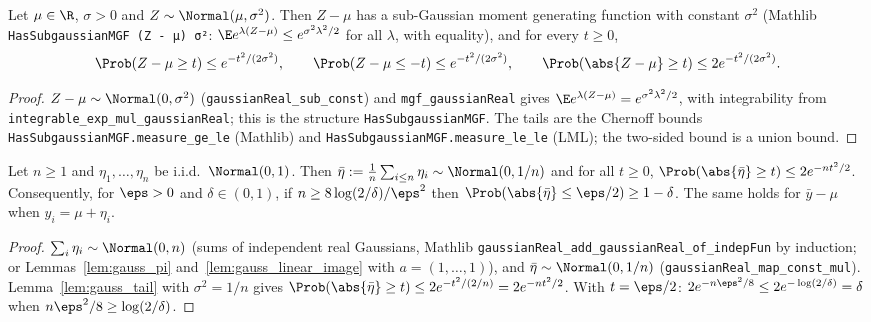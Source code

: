 \begin{lemma}\label{lem:gauss_tail}
\leanok
{}
Let $\mu \in \R$, $\sigma > 0$ and $Z \sim \Normal(\mu,\sigma^2)$. Then $Z - \mu$ has a
sub-Gaussian moment generating function with constant $\sigma^2$
(Mathlib \texttt{HasSubgaussianMGF (Z - μ) σ²}: $\E e^{\lambda(Z-\mu)} \le e^{\sigma^2\lambda^2/2}$
for all $\lambda$, with equality), and for every $t \ge 0$,
\[
  \Prob(Z - \mu \ge t) \le e^{-t^2/(2\sigma^2)}, \qquad
  \Prob(Z - \mu \le -t) \le e^{-t^2/(2\sigma^2)}, \qquad
  \Prob(\abs{Z - \mu} \ge t) \le 2e^{-t^2/(2\sigma^2)} .
\]
\end{lemma}

\begin{proof}
\leanok
{}
$Z - \mu \sim \Normal(0,\sigma^2)$ (\texttt{gaussianReal\_sub\_const}) and
\texttt{mgf\_gaussianReal} gives $\E e^{\lambda(Z-\mu)} = e^{\sigma^2\lambda^2/2}$, with
integrability from \texttt{integrable\_exp\_mul\_gaussianReal}; this is the structure
\texttt{HasSubgaussianMGF}. The tails are the Chernoff bounds
\texttt{HasSubgaussianMGF.measure\_ge\_le} (Mathlib) and
\texttt{HasSubgaussianMGF.measure\_le\_le} (LML); the two-sided bound is a union bound.
\end{proof}

\begin{lemma}\label{lem:gauss_mean_concentration}
Let $n \ge 1$ and $\eta_1,\dots,\eta_n$ be i.i.d.\ $\Normal(0,1)$. Then
$\bar\eta := \frac1n\sum_{i\le n}\eta_i \sim \Normal(0, 1/n)$ and for all $t \ge 0$,
$\Prob(\abs{\bar\eta} \ge t) \le 2e^{-nt^2/2}$. Consequently, for $\eps > 0$ and
$\delta \in (0,1)$, if $n \ge 8\log(2/\delta)/\eps^2$ then
$\Prob(\abs{\bar\eta} \le \eps/2) \ge 1 - \delta$. The same holds for $\bar y - \mu$ when
$y_i = \mu + \eta_i$.
\end{lemma}

\begin{proof}
$\sum_i\eta_i \sim \Normal(0,n)$ (sums of independent real Gaussians, Mathlib
\texttt{gaussianReal\_add\_gaussianReal\_of\_indepFun} by induction; or
Lemmas~\ref{lem:gauss_pi} and~\ref{lem:gauss_linear_image} with $a = (1,\dots,1)$), and
$\bar\eta \sim \Normal(0, 1/n)$ (\texttt{gaussianReal\_map\_const\_mul}). Lemma~\ref{lem:gauss_tail}
with $\sigma^2 = 1/n$ gives $\Prob(\abs{\bar\eta}\ge t) \le 2e^{-t^2/(2/n)} = 2e^{-nt^2/2}$.
With $t = \eps/2$: $2e^{-n\eps^2/8} \le 2e^{-\log(2/\delta)} = \delta$ when
$n\eps^2/8 \ge \log(2/\delta)$.
\end{proof}

